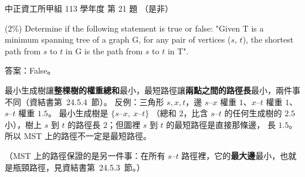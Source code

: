 \begin{pastexam}[label={px:ccu-113-swa-16}]{中正資工所甲組 113 學年度 第 21 題}
（是非）

(2\%) Determine if the following statement is true or false: "Given T is a minimum spanning tree of a graph G, for any pair of vertices ($s$, $t$), the shortest path from $s$ to $t$ in G is the path from $s$ to $t$ in T".
\end{pastexam}

\begin{pastsoln}
答案：False。

最小生成樹讓\textbf{整棵樹的權重總和}最小，最短路徑讓\textbf{兩點之間的路徑長}最小，兩件事不同（資結書第~24.5.4~節）。
反例：三角形 $s, x, t$，邊 $s$--$x$ 權重 $1$、$x$--$t$ 權重 $1$、$s$--$t$ 權重 $1.5$。 最小生成樹是 $\{s\text{--}x,\ x\text{--}t\}$
（總和 $2$，比含 $s$--$t$ 的任何生成樹的 $2.5$ 小），樹上 $s$ 到 $t$ 的路徑長 $2$；但圖裡 $s$ 到 $t$ 的最短路徑是直接那條邊，
長 $1.5$。 所以 MST 上的路徑不一定是最短路徑。

（MST 上的路徑保證的是另一件事：在所有 $s$--$t$ 路徑裡，它的\textbf{最大邊}最小，也就是瓶頸路徑，見資結書第~24.5.3~節。）
\end{pastsoln}
